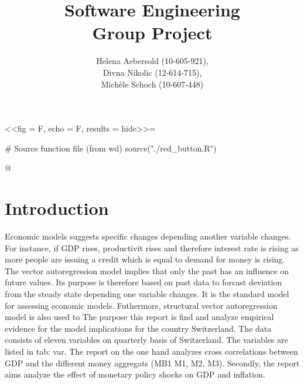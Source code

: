 \documentclass[11pt,a4paper]{report}
\begin{document}
\title{\textbf{Software Engineering} \\ \vspace{40pt} Group Project}
\author{Helena Aebersold (10-605-921), \\ Divna Nikolic (12-614-715), \\ Michèle Schoch (10-607-448)}
\maketitle


<<fig = F, echo = F, results = hide>>=

# Source function file (from wd)
source("./red_button.R")

@



\newpage
\section*{Introduction}
Economic models suggests specific changes depending another variable changes. For instance, if GDP rises, productivit rises and therefore interest rate is rising as more people are issuing a credit which is equal to demand for money is rising. The vector autoregression model implies that only the past has an influence on future values. Its purpose is therefore based on past data to forcast deviation from the steady state depending one variable changes. It is the standard model for assessing economic models. Futhermore, structural vector autoregression model is also used to 
The purpose  this report is find and analyze empirical evidence for the model implications for the country Switzerland. The data consists of eleven variables on quarterly basis of Switzerland. The variables are listed in tab: var. The report on the one hand analyzes cross correlations between GDP and the different money aggregats (MB1 M1, M2, M3). Secondly, the report aims analyze the effect of monetary policy shocks on GDP and inflation. 
\end{document}
